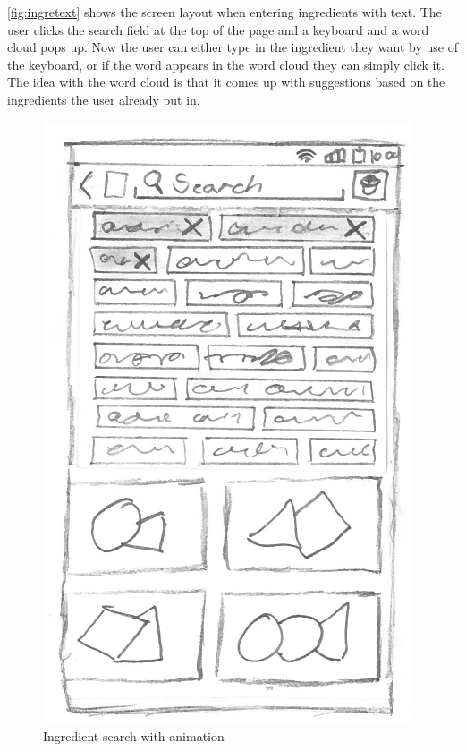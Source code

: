 \autoref{fig:ingretext} shows the screen layout when entering ingredients with text. The user clicks the search field at the top of the page and a keyboard and a word cloud pops up. Now the user can either type in the ingredient they want by use of the keyboard, or if the word appears in the word cloud they can simply click it. The idea with the word cloud is that it comes up with suggestions based on the ingredients the user already put in.

\begin{figure}[H]
\begin{minipage}[b]{0.5\columnwidth}
\centering
\includegraphics[width=0.7\columnwidth]{img/prototypes/ingredient_search_animation.pdf}
\caption{Ingredient search with animation\label{fig:ingreani}}
\end{minipage}
\hspace{0.5cm}
\begin{minipage}[b]{0.5\columnwidth}
\centering

\end{minipage}
\end{figure}
